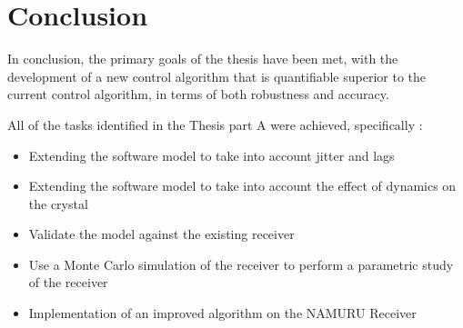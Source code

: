 \chapter{Conclusion}\label{ch:conclusion}

In conclusion, the primary goals of the thesis have been met, with the development of a new control algorithm that is quantifiable superior to the current control algorithm, in terms of both robustness and accuracy. 

All of the tasks identified in the Thesis part A were achieved, specifically : 
\begin{itemize}
\item{Extending the software model to take into account jitter and lags}
\item{Extending the software model to take into account the effect of dynamics on the crystal}
\item{Validate the model against the existing receiver}
\item{Use a Monte Carlo simulation of the receiver to perform a parametric study of the receiver}
\item{Implementation of an improved algorithm on the \ac{NAMURU} Receiver}
\end{itemize}





